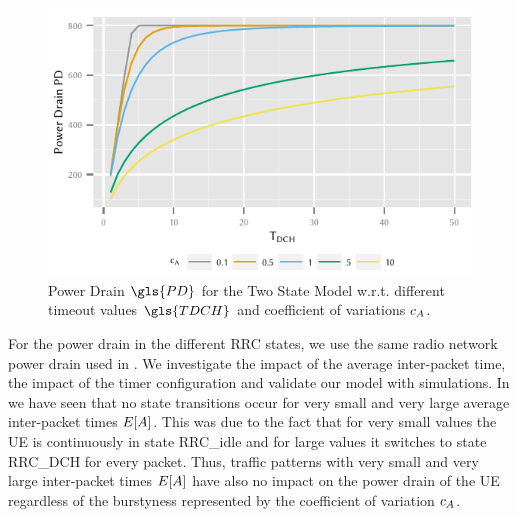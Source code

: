 \begin{figure}
	\centering
	\includegraphics{network/performance_model/numerical_examples/figures/2state_tdch_pd}
	\caption{Power Drain \(\gls{PD}\) for the Two State Model w.r.t. different timeout values \(\gls{TDCH}\) and coefficient of variations \(c_{A}\).}
	\label{fig:network:performance_model:numerical_examples:validations:analytic_vs_simulation:2state_tdch_pd}
\end{figure}

For the power drain in the different \gls{RRC} states, we use the same radio network power drain  used in .
We investigate the impact of the average inter-packet time, the impact of the timer configuration and validate our model with simulations. 
In  we have seen that no state transitions occur for very small and very large average inter-packet times \(E[A]\).
This was due to the fact that for very small values the \gls{UE} is continuously in state \gls{RRC_idle} and for large values it switches to state \gls{RRC_DCH} for every packet.
Thus, traffic patterns with very small and very large inter-packet times \(E[A]\) have also no impact on the power drain of the \gls{UE} regardless of the burstyness represented by the coefficient of variation \(c_{A}\).

